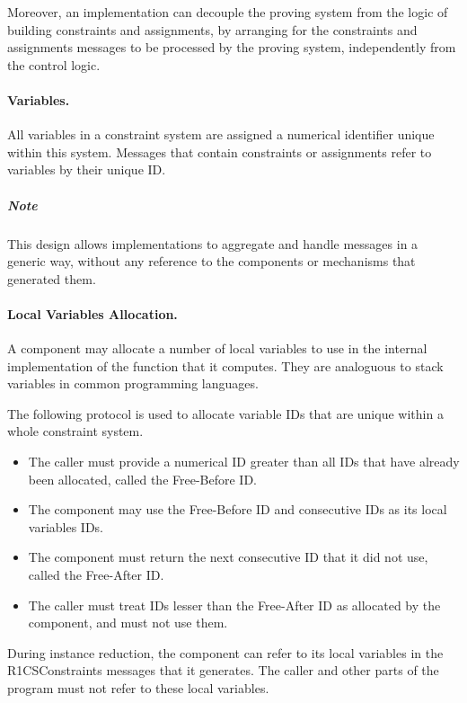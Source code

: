 	Moreover, an implementation can decouple the proving system
	from the logic of building constraints and assignments,
	by arranging for the constraints and assignments messages
	to be processed by the proving system, independently from the control logic.

\paragraph{Variables.}

	All variables in a constraint system are assigned a numerical identifier
	unique within this system.
	Messages that contain constraints or assignments refer to variables by their
	unique ID.

	\subparagraph{Note}
	This design allows implementations to aggregate and handle messages in a generic way,
	without any	reference to the components or mechanisms that generated them.


\paragraph{Local Variables Allocation.}

	A component may allocate a number of local variables to use
	in the internal implementation of the function that it computes.
	They are analoguous to stack variables in common programming languages.

	The following protocol is used to allocate variable IDs that are
	unique within a whole constraint system.
	\begin{itemize}
		\item The caller must provide a numerical ID greater than all IDs that have already been allocated, called the Free-Before ID.
		\item The component may use the Free-Before ID and consecutive IDs as its local variables IDs.
		\item The component must return the next consecutive ID that it did not use, called the Free-After ID.
		\item The caller must treat IDs lesser than the Free-After ID as allocated by the component,
			and must not use them.
	\end{itemize}

	During instance reduction, the component can refer to
	its local variables in the R1CSConstraints messages that it generates.
	The caller and other parts of the program must not refer to these local variables.

